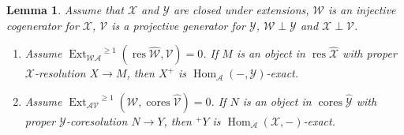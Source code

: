\documentclass{amsart}
\newtheorem{lem}{Lemma}[section]
\begin{document}
\begin{lem} \label{balance05}
Assume that ${{\mathcal{{X}}}}$ and ${{\mathcal{{Y}}}}$ are closed under extensions, 
${{\mathcal{{W}}}}$ is an injective cogenerator for ${{\mathcal{{X}}}}$, 
${{\mathcal{{V}}}}$ is a projective generator for ${{\mathcal{{Y}}}}$,
${{\mathcal{{W}}}}\perp{{\mathcal{{Y}}}}$ and ${{\mathcal{{X}}}}\perp{{\mathcal{{V}}}}$.
\begin{enumerate}[\quad\rm(a)]
\item \label{balance05item1}
Assume ${{\operatorname{Ext}}_{{{\mathcal{{W}}}} {{\mathcal{{A}}}}}}^{{\geqslant}1}({{\operatorname{res}{\widehat{{{\mathcal{{{W}}}}}}}}},{{\mathcal{{V}}}})=0$.
If $M$ is an object in ${{\operatorname{res}{\widehat{{{\mathcal{{{X}}}}}}}}}$ with proper ${{\mathcal{{X}}}}$-resolution
$X\to M$,
then $X^+$ is ${{\operatorname{Hom}}_{{\mathcal{{A}}}}}(-,{{\mathcal{{Y}}}})$-exact.
\item \label{balance05item2}
Assume ${{\operatorname{Ext}}_{{{\mathcal{{A}}}}{{\mathcal{{V}}}}}}^{{\geqslant}1}({{\mathcal{{W}}}}, {{\operatorname{cores}{\widehat{{{\mathcal{{{V}}}}}}}}})=0$.
If $N$ is an object in ${{\operatorname{cores}{\widehat{{{\mathcal{{{Y}}}}}}}}}$ with proper ${{\mathcal{{Y}}}}$-coresolution
$N\to Y$,
then $^+Y$ is ${{\operatorname{Hom}}_{{\mathcal{{A}}}}}({{\mathcal{{X}}}},-)$-exact.
\end{enumerate}
\end{lem}
\end{document}
